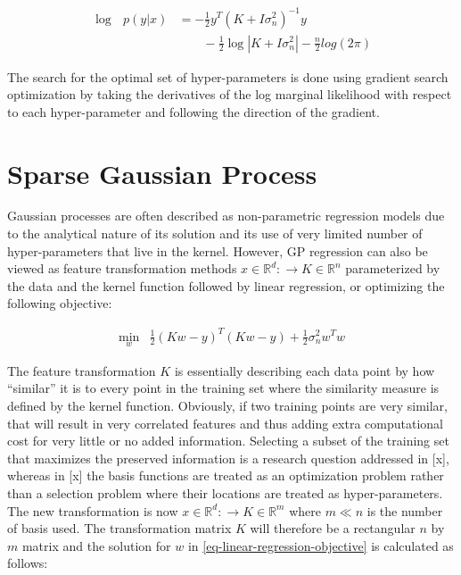 \documentclass[useAMS,usenatbib,fleqn]{mn2e}
\begin{document}
\begin{align}
\label{eq-log-marginal-likelihood}
\log\text{ }p(y|x) &= -\frac{1}{2}y^{T}\left(K+I\sigma_{n}^{2} \right)^{-1}y \nonumber \\
&\qquad -\frac{1}{2} \log\left | K+I\sigma_{n}^{2}\right|-\frac{n}{2}log(2\pi)
\end{align}

The search for the optimal set of hyper-parameters is done using gradient search optimization by taking the derivatives of the log marginal likelihood with respect to each hyper-parameter and following the direction of the gradient.

\section{Sparse Gaussian Process}
\label{sec-sparse-gaussian-process}
Gaussian processes are often described as non-parametric regression models due to the analytical nature of its solution and its use of very limited number of hyper-parameters that live in the kernel. However, GP regression can also be viewed as feature transformation methods $x\in \mathbb{R}^{d}:\rightarrow K\in \mathbb{R}^{n}$ parameterized by the data and the kernel function followed by linear regression, or optimizing the following objective:

\begin{equation}
\label{eq-linear-regression-objective}
\begin{array}{lcl}
\underset{w}{\text{min}} &\frac{1}{2}\left ( Kw-y \right )^{T}\left( Kw-y \right )+\frac{1}{2}\sigma_{n}^{2}w^{T}w
\end{array}
\end{equation}

The feature transformation $K$ is essentially describing each data point by how ``similar'' it is to every point in the training set where the similarity measure is defined by the kernel function. Obviously, if two training points are very similar, that will result in very correlated features and thus adding extra computational cost for very little or no added information. Selecting a subset of the training set that maximizes the preserved information is a research question addressed in [x], whereas in [x] the basis functions are treated as an optimization problem rather than a selection problem where their locations are treated as hyper-parameters. The new transformation is now $x\in \mathbb{R}^{d}:\rightarrow K\in \mathbb{R}^{m}$ where $m\ll n$ is the number of basis used. The transformation matrix $K$ will therefore be a rectangular $n$ by $m$ matrix and the solution for $w$ in \eqref{eq-linear-regression-objective} is calculated as follows:
\end{document}
